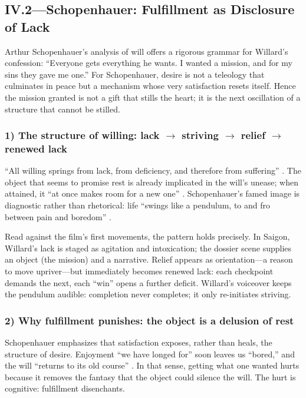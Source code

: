 \subsection*{IV.2—Schopenhauer: Fulfillment as Disclosure of Lack}
\label{ssec:iii-schopenhauer}
Arthur Schopenhauer's analysis of will offers a rigorous grammar for Willard's confession:
``Everyone gets everything he wants. I wanted a mission, and for my sins they gave me one.''
For Schopenhauer, desire is not a teleology that culminates in peace but a mechanism whose
very satisfaction resets itself. Hence the mission granted is not a gift that stills the heart;
it is the next oscillation of a structure that cannot be stilled.

\subsubsection*{1) The structure of willing: lack $\rightarrow$ striving
	$\rightarrow$ relief $\rightarrow$ renewed lack}

``All willing springs from lack, from deficiency, and therefore from suffering''
\parencite[p.~196]{SchopenhauerWWR1969}. The object that seems to promise rest is already
implicated in the will's unease; when attained, it ``at once makes room for a new one''
\parencite[p.~319]{SchopenhauerWWR1969}. Schopenhauer's famed image is diagnostic rather
than rhetorical: life ``swings like a pendulum, to and fro between pain and boredom''
\parencite[p.~312]{SchopenhauerWWR1969}.

Read against the film's first movements, the pattern holds precisely. In Saigon, Willard's
lack is staged as agitation and intoxication; the dossier scene supplies an object (the mission)
and a narrative. Relief appears as orientation—a reason to move upriver—but immediately becomes
renewed lack: each checkpoint demands the next, each ``win'' opens a further deficit.
Willard's voiceover keeps the pendulum audible: completion never completes; it only
re-initiates striving.

\subsubsection*{2) Why fulfillment punishes: the object is a delusion of rest}

Schopenhauer emphasizes that satisfaction exposes, rather than heals, the structure of desire.
Enjoyment ``we have longed for'' soon leaves us ``bored,'' and the will ``returns to its old
course'' \parencite[p.~319]{SchopenhauerWWR1969}. In that sense, getting what one wanted hurts
because it removes the fantasy that the object could silence the will. The hurt is cognitive:
fulfillment disenchants.

